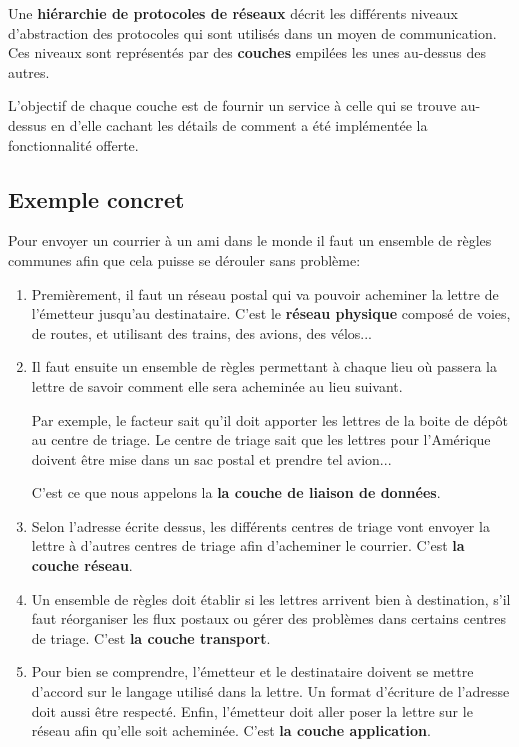 \documentclass[11pt, a4paper]{book}
\begin{document}
\begin{defi}
Une {\bf hiérarchie de protocoles de réseaux} décrit les différents niveaux d'abstraction des protocoles qui sont utilisés dans un moyen de communication. Ces niveaux sont représentés par des {\bf couches} empilées les unes au-dessus des autres.
\end{defi}

L'objectif de chaque couche est de fournir un service à celle qui se trouve au-dessus en d'elle cachant les détails de comment a été implémentée la fonctionnalité offerte.

\subsection{Exemple concret}

Pour envoyer un courrier à un ami dans le monde il faut un ensemble de règles communes afin que cela puisse se dérouler sans problème:

\begin{enumerate}
\item Premièrement, il faut un réseau postal qui va pouvoir acheminer la lettre de l'émetteur jusqu'au destinataire. C'est le {\bf réseau physique} composé de voies, de routes, et utilisant des trains, des avions, des vélos...
\item Il faut ensuite un ensemble de règles permettant à chaque lieu où passera la lettre de savoir comment elle sera acheminée au lieu suivant.

 Par exemple, le facteur sait qu'il doit apporter les lettres de la boite de dépôt au centre de triage. Le centre de triage sait que les lettres pour l'Amérique doivent être mise dans un sac postal et prendre tel avion...
 
 C'est ce que nous appelons la {\bf la couche de liaison de données}. 
 
 \item Selon l'adresse écrite dessus, les différents centres de triage vont envoyer la lettre à d'autres centres de triage afin d'acheminer le courrier. C'est {\bf la couche réseau}.
 
 \item Un ensemble de règles doit établir si les lettres arrivent bien à destination, s'il faut réorganiser les flux postaux ou gérer des problèmes dans certains centres de triage. C'est {\bf la couche transport}.
 
 \item Pour bien se comprendre, l'émetteur et le destinataire doivent se mettre d'accord sur le langage utilisé dans la lettre. Un format d'écriture de l'adresse doit aussi être respecté. Enfin, l'émetteur doit aller poser la lettre sur le réseau afin qu'elle soit acheminée. C'est {\bf la couche application}. 
 \end{enumerate}
\end{document}
